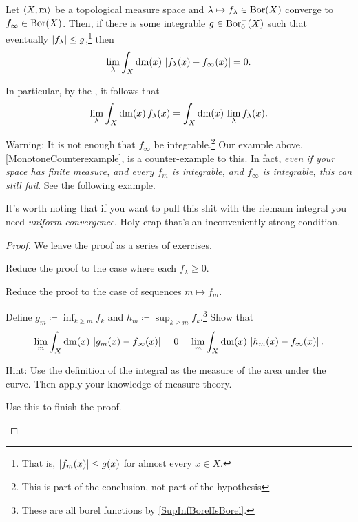 \begin{thm}\label{DominatedConvergenceTheorem}
Let $\langle X,\mathrm{m}\rangle$ be a topological measure space and $\lambda \mapsto f_\lambda \in \operatorname{Bor} (X)$ converge to $f_\infty \in \operatorname{Bor} (X)$.  Then, if there is some integrable $g\in \operatorname{Bor} _0^+(X)$ such that eventually $\lvert f_\lambda\rvert\leq g$,\footnote{That is, $\lvert f_m(x)\rvert\leq g(x)$ for almost every $x\in X$.} then
\begin{equation}
\lim _\lambda \int _X\mathop{}\!\mathrm{d} \mathrm{m} (x)\, \left| f_\lambda (x)-f_\infty (x)\right| =0.
\end{equation}
\begin{rmk}
In particular, by the , it follows that
\begin{equation}
\lim _\lambda \int _X\mathop{}\!\mathrm{d} \mathrm{m} (x)\, f_\lambda (x)=\int _X\mathop{}\!\mathrm{d} \mathrm{m} (x)\, \lim _\lambda f_\lambda (x).
\end{equation}
\end{rmk}
\begin{rmk}
Warning:  It is not enough that $f_\infty$ be integrable.\footnote{This is part of the conclusion, not part of the hypothesis}  Our example above, \cref{MonotoneCounterexample}, is a counter-example to this.  In fact, \emph{even if your space has finite measure, and every $f_m$ is integrable, and $f_\infty$ is integrable, this can still fail}.  See the following example.
\end{rmk}
\begin{rmk}
It's worth noting that if you want to pull this shit with the riemann integral you need \emph{uniform convergence}.  Holy crap that's an inconveniently strong condition.
\end{rmk}
\begin{proof}
We leave the proof as a series of exercises.
\begin{exr}
Reduce the proof to the case where each $f_\lambda \geq 0$.
\end{exr}
\begin{exr}
Reduce the proof to the case of sequences $m\mapsto f_m$.
\end{exr}
\begin{exr}
Define $g_m\coloneqq \inf _{k\geq m}f_k$ and $h_m\coloneqq \sup _{k\geq m}f_k$.\footnote{These are all borel functions by \cref{SupInfBorelIsBorel}.}  Show that
\begin{equation}
\lim _m\int _X\mathop{}\!\mathrm{d} \mathrm{m} (x)\, \left| g_m(x)-f_\infty (x)\right| =0=\lim _m\int _X\mathop{}\!\mathrm{d} \mathrm{m} (x)\, \left| h_m(x)-f_\infty (x)\right| .
\end{equation}
\begin{rmk}
Hint:  Use the definition of the integral as the measure of the area under the curve.  Then apply your knowledge of measure theory.
\end{rmk}
\end{exr}
\begin{exr}
Use this to finish the proof.
\end{exr}
\end{proof}
\end{thm}
